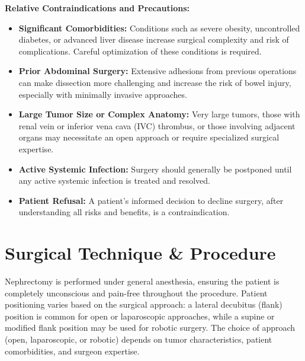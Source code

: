 \textbf{Relative Contraindications and Precautions:}
\begin{itemize}
  \item \textbf{Significant Comorbidities:} Conditions such as severe obesity, uncontrolled diabetes, or advanced liver disease increase surgical complexity and risk of complications. Careful optimization of these conditions is required.
  \item \textbf{Prior Abdominal Surgery:} Extensive adhesions from previous operations can make dissection more challenging and increase the risk of bowel injury, especially with minimally invasive approaches.
  \item \textbf{Large Tumor Size or Complex Anatomy:} Very large tumors, those with renal vein or inferior vena cava (IVC) thrombus, or those involving adjacent organs may necessitate an open approach or require specialized surgical expertise.
  \item \textbf{Active Systemic Infection:} Surgery should generally be postponed until any active systemic infection is treated and resolved.
  \item \textbf{Patient Refusal:} A patient's informed decision to decline surgery, after understanding all risks and benefits, is a contraindication.
\end{itemize}

\section*{Surgical Technique \& Procedure}
Nephrectomy is performed under general anesthesia, ensuring the patient is completely unconscious and pain-free throughout the procedure. Patient positioning varies based on the surgical approach: a lateral decubitus (flank) position is common for open or laparoscopic approaches, while a supine or modified flank position may be used for robotic surgery. The choice of approach (open, laparoscopic, or robotic) depends on tumor characteristics, patient comorbidities, and surgeon expertise.

